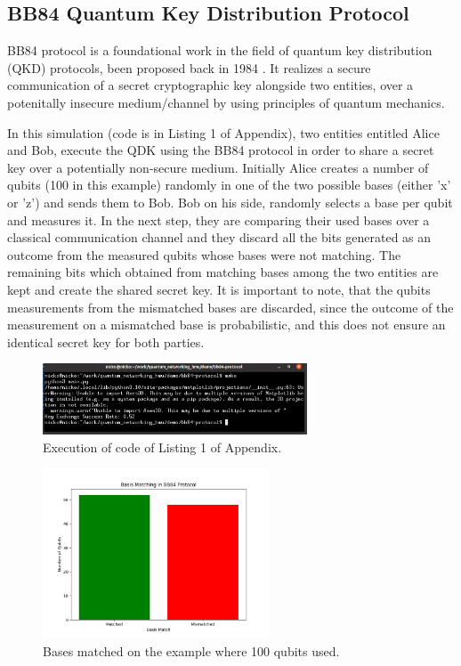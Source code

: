 \documentclass[12pt]{ieeetj}
\begin{document}
		\subsection{BB84 Quantum Key Distribution Protocol}

		BB84 protocol is a foundational work in the field
		of quantum key distribution (QKD) protocols,
		been proposed back in 1984 \cite{bb84}.
		It realizes a secure communication of a secret cryptographic key
		alongside two entities, over a potenitally insecure medium/channel
		by using principles of quantum mechanics.
		
		In this simulation (code is in Listing 1 of Appendix),
		two entities entitled Alice and Bob, execute the QDK using the BB84 protocol
		in order to share a secret key over a potentially non-secure medium. Initially Alice creates
		a number of qubits (100 in this example) randomly in one of the two possible bases (either 'x' or 'z') and sends them 
		to Bob. Bob on his side, randomly selects a base per qubit and measures it. In the next step, 
		they are comparing their used bases over a classical communication channel and 
		they discard all the bits generated as an outcome from the measured qubits whose bases were not matching.
		The remaining bits which obtained from matching bases among the two entities are kept and create the shared secret key.
		It is important to note, that the qubits measurements from the mismatched bases are 
		discarded, since the outcome of the measurement on a mismatched base is probabilistic,
		and this does not ensure an identical secret key for both parties.

		\begin{figure}[H]
			\centering
			\includegraphics[width=0.7\textwidth]{bb84/success_rate_terminal.png}
			\caption{Execution of code of Listing 1 of Appendix.}
			\label{fig1:}
		\end{figure}		

		\begin{figure}[H]
			\centering
			\includegraphics[width=0.6\textwidth]{bb84/basis_matching.png}
			\caption{Bases matched on the example where 100 qubits used.}
			\label{fig2:}
		\end{figure}		
\end{document}
